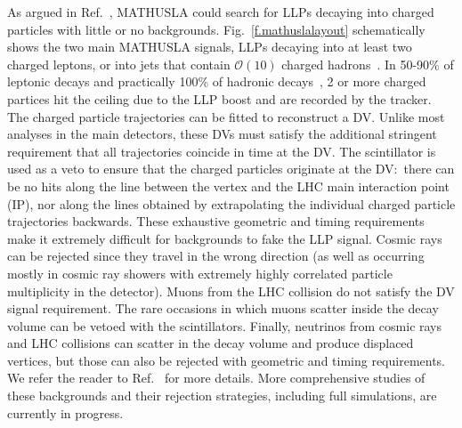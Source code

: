 As argued in Ref.~\cite{Chou:2016lxi}, MATHUSLA could search for LLPs decaying into  charged particles with little or no backgrounds. 
%
Fig.~\ref{f.mathuslalayout} schematically shows the two main MATHUSLA signals, LLPs decaying into at least two charged leptons, or into jets that contain $\mathcal{O}(10)$ charged hadrons~\cite{Curtin:2017izq}. 
In 50-90\% of leptonic decays and practically 100\% of hadronic decays~\cite{Curtin:2017izq}, 2 or more charged partices hit the ceiling due to the LLP boost and are recorded by the tracker. The charged particle trajectories can be fitted to reconstruct a DV.
%
Unlike most analyses in the main detectors, these DVs must satisfy the additional stringent requirement that all trajectories coincide in time at the DV. 
%
The scintillator is used as a veto to ensure that the charged particles originate at the DV:~there can be no hits along the line between the vertex and the LHC main interaction point (IP), nor along the lines obtained by extrapolating the individual charged particle trajectories backwards.
%
These exhaustive geometric and timing requirements make it extremely difficult for backgrounds to fake the LLP signal.
%
Cosmic rays can be rejected since they travel in the wrong direction (as well as occurring mostly in cosmic ray showers with extremely highly correlated particle multiplicity in the detector).  
%
Muons from the LHC collision do not satisfy the DV signal requirement. The rare occasions in which muons scatter inside the decay volume can be vetoed with the scintillators. 
%
Finally, neutrinos from cosmic rays and LHC collisions can scatter in the decay volume and produce displaced vertices, but those can also be rejected with geometric and timing requirements. 
We refer the reader to Ref.~\cite{Chou:2016lxi} for more details. 
%
More comprehensive studies of these backgrounds and their rejection strategies, including full simulations, are currently in progress. 



